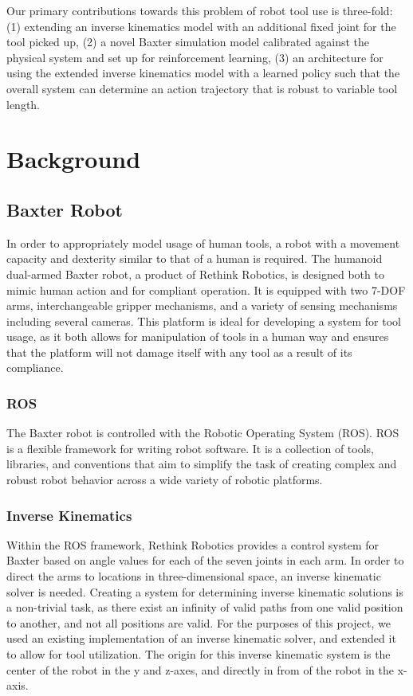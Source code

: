 \documentclass[conference]{IEEEtran}
\begin{document}
Our primary contributions towards this problem of robot tool use is three-fold: (1) extending an inverse kinematics model with an additional fixed joint for the tool picked up, (2) a novel Baxter simulation model calibrated against the physical system and set up for reinforcement learning, (3) an architecture for using the extended inverse kinematics model with a learned policy such that the overall system can determine an action trajectory that is robust to variable tool length. 

\section{Background}

\subsection{Baxter Robot}
In order to appropriately model usage of human tools, a robot with a movement capacity and dexterity similar to that of a human is required. The humanoid dual-armed Baxter robot, a product of Rethink Robotics, is designed both to mimic human action and for compliant operation. It is equipped with two 7-DOF arms, interchangeable gripper mechanisms, and a variety of sensing mechanisms including several cameras.\cite{aboutBaxter} This platform is ideal for developing a system for tool usage, as it both allows for manipulation of tools in a human way and ensures that the platform will not damage itself with any tool as a result of its compliance.
\vspace{2mm}
\subsubsection{ROS}
The Baxter robot is controlled with the Robotic Operating System (ROS). ROS is a flexible framework for writing robot software. It is a collection of tools, libraries, and conventions that aim to simplify the task of creating complex and robust robot behavior across a wide variety of robotic platforms.\cite{ros}
\vspace{2mm}
\subsubsection{Inverse Kinematics}
Within the ROS framework, Rethink Robotics provides a control system for Baxter based on angle values for each of the seven joints in each arm. In order to direct the arms to locations in three-dimensional space, an inverse kinematic solver is needed. Creating a system for determining inverse kinematic solutions is a non-trivial task, as there exist an infinity of valid paths from one valid position to another, and not all positions are valid. For the purposes of this project, we used an existing implementation of an inverse kinematic solver\cite{ik}, and extended it to allow for tool utilization. The origin for this inverse kinematic system is the center of the robot in the y and z-axes, and directly in from of the robot in the x-axis. 
\end{document}
